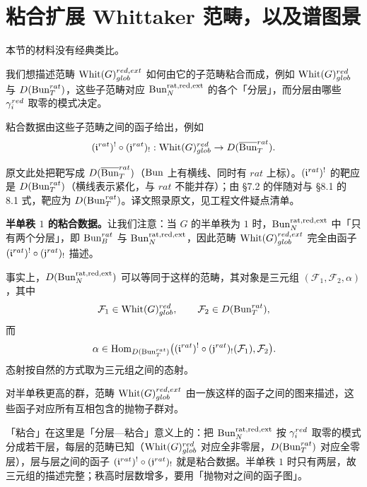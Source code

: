 \section{粘合扩展 Whittaker 范畴，以及谱图景}

本节的材料没有经典类比。

我们想描述范畴 $\mathrm{Whit}(G)^{red,ext}_{glob}$ 如何由它的子范畴粘合而成，例如 $\mathrm{Whit}(G)^{red}_{glob}$ 与 $D(\operatorname{Bun}^{rat}_T)$，这些子范畴对应 $\operatorname{Bun}^{\mathrm{rat},\mathrm{red},\mathrm{ext}}_N$ 的各个「分层」，而分层由哪些 $\gamma_i^{red}$ 取零的模式决定。

粘合数据由这些子范畴之间的函子给出，例如
\[
  (\mathfrak{i}^{rat})^!\circ(\mathfrak{j}^{rat})_! : \mathrm{Whit}(G)^{red}_{glob}\to D(\overline{\operatorname{Bun}}^{rat}_T).
\]

\begin{annote}
原文此处把靶写成 $D(\overline{\operatorname{Bun}}^{rat}_T)$（$\operatorname{Bun}$ 上有横线、同时有 $rat$ 上标）。$(\mathfrak{i}^{rat})^!$ 的靶应是 $D(\operatorname{Bun}^{rat}_T)$（横线表示紧化，与 $rat$ 不能并存）；由 §7.2 的伴随对与 §8.1 的 8.1 式，靶应为 $D(\operatorname{Bun}^{rat}_T)$。译文照录原文，见工程文件疑点清单。\par\vspace{0.15em}{\raggedleft 【来源：原书 p.16 §8（A）；译者按（类型检查）】\par}
\end{annote}

\textbf{半单秩 $1$ 的粘合数据。}让我们注意：当 $G$ 的半单秩为 $1$ 时，$\operatorname{Bun}^{\mathrm{rat},\mathrm{red},\mathrm{ext}}_N$ 中「只有两个分层」，即 $\operatorname{Bun}^{rat}_B$ 与 $\operatorname{Bun}^{\mathrm{rat},\mathrm{red},\mathrm{ext}}_N$，因此范畴 $\mathrm{Whit}(G)^{red,ext}_{glob}$ 完全由函子 $(\mathfrak{i}^{rat})^!\circ(\mathfrak{j}^{rat})_!$ 描述。

事实上，$D(\operatorname{Bun}^{\mathrm{rat},\mathrm{red},\mathrm{ext}}_N)$ 可以等同于这样的范畴，其对象是三元组 $(\mathcal F_1,\mathcal F_2,\alpha)$，其中
\[
  \mathcal F_1\in\mathrm{Whit}(G)^{red}_{glob},\qquad
  \mathcal F_2\in D(\operatorname{Bun}^{rat}_T),
\]
而
\[
  \alpha\in\operatorname{Hom}_{D(\operatorname{Bun}^{rat}_T)}\bigl((\mathfrak{i}^{rat})^!\circ(\mathfrak{j}^{rat})_!(\mathcal F_1),\mathcal F_2\bigr).
\]
态射按自然的方式取为三元组之间的态射。

对半单秩更高的群，范畴 $\mathrm{Whit}(G)^{red,ext}_{glob}$ 由一族这样的函子之间的图来描述，这些函子对应所有互相包含的抛物子群对。

\begin{annote}
「粘合」在这里是「分层—粘合」意义上的：把 $\operatorname{Bun}^{\mathrm{rat},\mathrm{red},\mathrm{ext}}_N$ 按 $\gamma_i^{red}$ 取零的模式分成若干层，每层的范畴已知（$\mathrm{Whit}(G)^{red}_{glob}$ 对应全非零层，$D(\operatorname{Bun}^{rat}_T)$ 对应全零层），层与层之间的函子 $(\mathfrak{i}^{rat})^!\circ(\mathfrak{j}^{rat})_!$ 就是粘合数据。半单秩 $1$ 时只有两层，故三元组的描述完整；秩高时层数增多，要用「抛物对之间的函子图」。\par\vspace{0.15em}{\raggedleft 【来源：原书 p.16 §8.1（A）；译者按（把分层的含义说清）】\par}
\end{annote}

